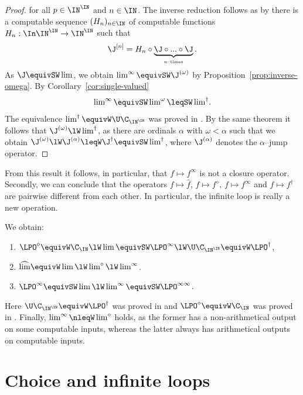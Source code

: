 \documentclass{lmcs}
\begin{document}
\begin{proof}
for all $p\in\IN^\IN$ and $n\in\IN$.
The inverse reduction follows as by \cite[Theorem~2.14]{Bra18} there is a computable sequence $(H_n)_{n\in\IN}$ of computable
functions $H_n:\In\IN^\IN\to\IN^\IN$ such that
\[\J^{[n]}=H_n\circ\underbrace{\J\circ...\circ\J}_{\mbox{\tiny $n$--times}}.\]
As $\J\equivSW\lim$, we obtain $\lim^\infty\equivSW\J^{(\omega)}$ by Proposition~\ref{prop:inverse-omega}.
By Corollary~\ref{cor:single-valued}
\[\mbox{$\lim^\infty\equivSW\lim^\omega\leqSW\lim^\dagger$}.\]
The equivalence $\lim^\dagger\equivW\U\C_{\IN^\IN}$ was proved in \cite[Theorem~80]{Pau15}.
By the same theorem it follows that $\J^{(\omega)}\lW\lim^\dagger$, as 
there are ordinals $\alpha$ with $\omega<\alpha$ such that we obtain $\J^{(\omega)}\lW\J^{(\alpha)}\leqW\J^\dagger\equivSW\lim^\dagger$, where $\J^{(\alpha)}$ denotes the $\alpha$--jump operator.
\end{proof}

\noindent
From this result it follows, in particular, that $f\mapsto f^\infty$ is not a closure operator.
Secondly, we can conclude that the operators $f\mapsto\widehat{f}$, $f\mapsto f^\diamond$,
$f\mapsto f^\infty$ and $f\mapsto f^\dagger$ are pairwise different from each other.
In particular, the infinite loop is really a new operation.

\begin{cor}
We obtain:
\begin{enumerate}
\item $\LPO^\diamond\equivW\C_\IN\lW\lim\equivSW\LPO^\infty\lW\U\C_{\IN^\IN}\equivW \LPO^\dagger$,
\item $\widehat{\lim}\equivW\lim\lW\lim^\diamond\lW\lim^\infty$.
\item $\LPO^\infty\equivSW\lim\lW\lim^\infty\equivSW\LPO^{\infty\infty}$.
\end{enumerate}
\end{cor}

\noindent
Here $\U\C_{\IN^\IN}\equivW\LPO^\dagger$ was proved in \cite[Theorem~80]{Pau15}
and $\LPO^\diamond\equivW\C_\IN$ was proved in \cite[Proposition~10]{NP18}.
Finally, $\lim^\infty\nleqW\lim^\diamond$ holds, as the former has a non-arithmetical output on
some computable inputs, whereas the latter always has arithmetical outputs on computable inputs.


\section{Choice and infinite loops}
\label{sec:choice}
\end{document}
